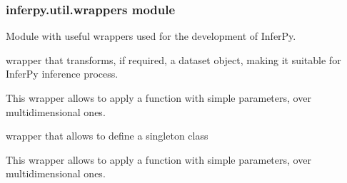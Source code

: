 \documentclass[letterpaper,10pt,english]{sphinxmanual}
\begin{document}
\subsubsection{inferpy.util.wrappers module}
\label{\detokenize{modules/inferpy.util:inferpy-util-wrappers-module}}\label{\detokenize{modules/inferpy.util:module-inferpy.util.wrappers}}
Module with useful wrappers used for the development of InferPy.

\begin{fulllineitems}
\label{\detokenize{modules/inferpy.util:inferpy.util.wrappers.input_model_data}}
wrapper that transforms, if required, a dataset object, making it suitable for InferPy inference
process.

\end{fulllineitems}


\begin{fulllineitems}
\label{\detokenize{modules/inferpy.util:inferpy.util.wrappers.multishape}}
This wrapper allows to apply a function with simple parameters, over multidimensional ones.

\end{fulllineitems}


\begin{fulllineitems}
\label{\detokenize{modules/inferpy.util:inferpy.util.wrappers.singleton}}
wrapper that allows to define a singleton class

\end{fulllineitems}


\begin{fulllineitems}
\label{\detokenize{modules/inferpy.util:inferpy.util.wrappers.static_multishape}}
This wrapper allows to apply a function with simple parameters, over multidimensional ones.

\end{fulllineitems}
\end{document}

